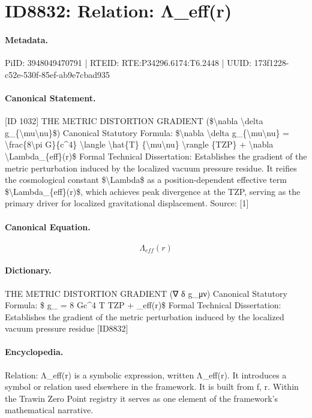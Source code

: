 \section*{ID8832: Relation: Λ\_eff(r)}
\paragraph{Metadata.}
PiID: 3948049470791 | RTEID: RTE:P34296.6174:T6.2448 | UUID: 173f1228-c52e-530f-85ef-ab9e7cbad935

\paragraph{Canonical Statement.}
[ID 1032] THE METRIC DISTORTION GRADIENT (\$\textbackslash{}nabla \textbackslash{}delta g\_\{\textbackslash{}mu\textbackslash{}nu\}\$) Canonical Statutory Formula: \$\textbackslash{}nabla \textbackslash{}delta g\_\{\textbackslash{}mu\textbackslash{}nu\} = \textbackslash{}frac\{8\textbackslash{}pi G\}\{c\textasciicircum{}4\} \textbackslash{}langle \textbackslash{}hat\{T\} \{\textbackslash{}mu\textbackslash{}nu\} \textbackslash{}rangle \{TZP\} + \textbackslash{}nabla \textbackslash{}Lambda\_\{eff\}(r)\$ Formal Technical Dissertation: Establishes the gradient of the metric perturbation induced by the localized vacuum pressure residue. It reifies the cosmological constant \$\textbackslash{}Lambda\$ as a position-dependent effective term \$\textbackslash{}Lambda\_\{eff\}(r)\$, which achieves peak divergence at the TZP, serving as the primary driver for localized gravitational displacement. Source: [1]

\paragraph{Canonical Equation.}
\[
\Lambda_{eff}(r)
\]

\paragraph{Dictionary.}
THE METRIC DISTORTION GRADIENT (∇ δ g\_μν) Canonical Statutory Formula: \$ g\_ = 8 Gc\textasciicircum{}4 T TZP + \_eff(r)\$ Formal Technical Dissertation: Establishes the gradient of the metric perturbation induced by the localized vacuum pressure residue [ID8832]

\paragraph{Encyclopedia.}
Relation: Λ\_eff(r) is a symbolic expression, written Λ\_eff(r). It introduces a symbol or relation used elsewhere in the framework. It is built from f, r. Within the Trawin Zero Point registry it serves as one element of the framework's mathematical narrative.
